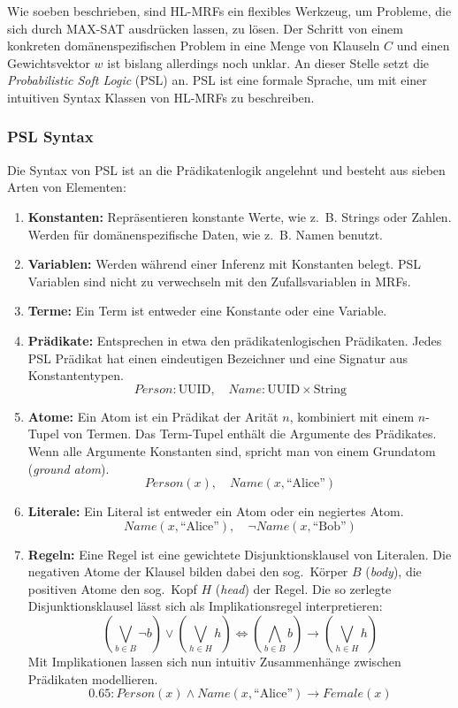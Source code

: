 Wie soeben beschrieben, sind HL-MRFs ein flexibles Werkzeug, um Probleme, die sich durch MAX-SAT ausdrücken lassen, zu lösen.
Der Schritt von einem konkreten domänenspezifischen Problem in eine Menge von Klauseln $C$ und einen Gewichtsvektor $w$ ist bislang allerdings noch unklar.
An dieser Stelle setzt die \textit{Probabilistic Soft Logic} (PSL) an.
PSL ist eine formale Sprache, um mit einer intuitiven Syntax Klassen von HL-MRFs zu beschreiben.

\subsubsection{PSL Syntax}
Die Syntax von PSL ist an die Prädikatenlogik angelehnt und besteht aus sieben Arten von Elementen:
\begin{enumerate}
	\item \textbf{Konstanten:}
		Repräsentieren konstante Werte, wie z.~B. Strings oder Zahlen.
		Werden für domänenspezifische Daten, wie z.~B. Namen benutzt.
	\item \textbf{Variablen:}
		Werden während einer Inferenz mit Konstanten belegt.
		PSL Variablen sind nicht zu verwechseln mit den Zufallsvariablen in MRFs.
	\item \textbf{Terme:}
		Ein Term ist entweder eine Konstante oder eine Variable.
	\item \textbf{Prädikate:}
		Entsprechen in etwa den prädikatenlogischen Prädikaten.
		Jedes PSL Prädikat hat einen eindeutigen Bezeichner und eine Signatur aus Konstantentypen.
		\[Person: \text{UUID},\quad Name: \text{UUID} \times \text{String}\]
	\item \textbf{Atome:}
		Ein Atom ist ein Prädikat der Arität $n$, kombiniert mit einem $n$-Tupel von Termen.
		Das Term-Tupel enthält die Argumente des Prädikates.
		Wenn alle Argumente Konstanten sind, spricht man von einem Grundatom (\textit{ground atom}). \\
		\[Person(x),\quad Name(x, \text{``Alice''})\] %
	\item \textbf{Literale:}
		Ein Literal ist entweder ein Atom oder ein negiertes Atom. \\
		\[Name(x, \text{``Alice''}),\quad \lnot Name(x, \text{``Bob''})\] %
	\item \textbf{Regeln:}
		Eine Regel ist eine gewichtete Disjunktionsklausel von Literalen.
		Die negativen Atome der Klausel bilden dabei den sog.\ Körper $B$ (\textit{body}), die positiven Atome den sog.\ Kopf $H$ (\textit{head}) der Regel.
		Die so zerlegte Disjunktionsklausel lässt sich als Implikationsregel interpretieren:
		\[
			\left(\bigvee_{b \in B} \lnot b\right) \lor \left(\bigvee_{h \in H} h\right) \Leftrightarrow \left(\bigwedge_{b \in B}  b\right) \rightarrow \left(\bigvee_{h \in H} h\right)
		\]
		Mit Implikationen lassen sich nun intuitiv Zusammenhänge zwischen Prädikaten modellieren.\\
		\[0.65: Person(x) \land Name(x, \text{``Alice''}) \rightarrow Female(x)\] %
\end{enumerate}

